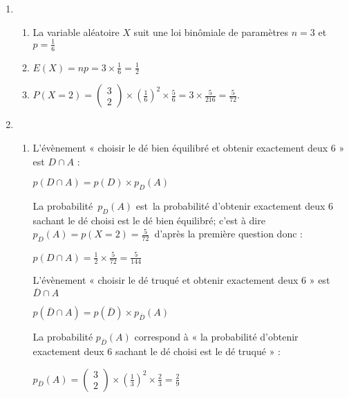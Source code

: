 \begin{corrige}
     \begin{enumerate}
          \item
          \begin{enumerate}
               \item
               La variable aléatoire $X$ suit une loi binômiale de paramètres $n=3$ et $p=\frac{1}{6}$
               \item
               $E\left(X\right)=np=3\times \frac{1}{6}=\frac{1}{2}$
               \item
               $P\left(X=2\right)=\begin{pmatrix} 3 \\ 2 \end{pmatrix}\times \left(\frac{1}{6}\right)^{2}\times \frac{5}{6}=3\times \frac{5}{216}=\frac{5}{72}$.
          \end{enumerate}
          \item
          \begin{enumerate}
               \item
               L'évènement « choisir le dé bien équilibré et obtenir exactement deux 6 » est $D \cap A$ :
               \par
               $p\left(D \cap A\right)=p\left(D\right)\times p_{D}\left(A\right)$
               \par
               La probabilité $ p_{D}\left(A\right)$ est la probabilité d'obtenir exactement deux 6 sachant le dé choisi est le dé bien équilibré; c'est à dire  $p_{D}(A)=p(X=2)=\frac{5}{72}$ d'après la première question donc :
               \par
               $p\left(D \cap A\right)=\frac{1}{2}\times \frac{5}{72}=\frac{5}{144}$
               \par
               L'évènement « choisir le dé truqué et obtenir exactement deux 6 » est $\overline{D} \cap A$
               \par
               $p\left(\overline{D} \cap A\right)=p\left(\overline{D}\right)\times p_{\overline{D}}\left(A\right)$
               \par
               La probabilité $p_{\overline{D}}\left(A\right)$ correspond à « la probabilité d'obtenir exactement deux 6 sachant le dé choisi est le dé truqué » :
               \par
               $p_{\overline{D}}\left(A\right)=\begin{pmatrix} 3 \\ 2 \end{pmatrix}\times \left(\frac{1}{3}\right)^{2}\times \frac{2}{3}=\frac{2}{9}$

\end{enumerate}
\end{enumerate}
\end{corrige}
